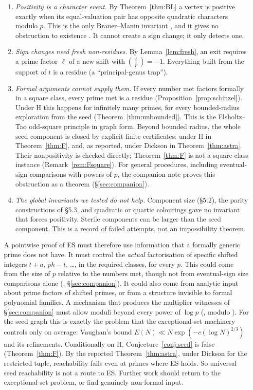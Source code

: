 \documentclass[11pt,reqno]{amsart}
\theoremstyle{definition}
\newcommand{\leg}[2]{\left(\frac{#1}{#2}\right)}
\begin{document}
\begin{enumerate}
\item \emph{Positivity is a character event.}  By Theorem~\ref{thm:BL} a
vertex is positive exactly when its equal-valuation pair has opposite
quadratic characters modulo $p$.  This is the only Brauer--Manin invariant
\cite[Thm.~1.6]{BL}, and it gives no obstruction to existence
\cite[Thm.~1.1]{BL}.  It cannot create a sign change; it only detects one.
\item \emph{Sign changes need fresh non-residues.}  By
Lemma~\ref{lem:fresh}, an exit requires a prime factor $\ell$ of a new
shift with $\leg\ell p=-1$.  Everything built from the support of $t$ is a
residue (a ``principal-genus trap'').
\item \emph{Formal arguments cannot supply them.}  If every number met
factors formally in a square class, every prime met is a residue
(Proposition~\ref{prop:schinzel}).  Under H this happens for infinitely
many primes, for every bounded-radius exploration from the seed
(Theorem~\ref{thm:unbounded}).  This is the Elsholtz--Tao odd-square
principle in graph form.  Beyond bounded radius, the whole seed component
is closed by explicit finite certificates: under H in Theorem~\ref{thm:F},
and, as reported, under Dickson in Theorem~\ref{thm:astra}.  Their
nonpositivity is checked directly; Theorem~\ref{thm:F} is not a
square-class instance (Remark~\ref{rem:Fsquare}).  For general
procedures, including eventual-sign comparisons with powers of $p$, the
companion note \cite{PS} proves this obstruction as a theorem
(\S\ref{sec:companion}).
\item \emph{The global invariants we tested do not help.}  Component size
(\S5.2), the parity constructions of \S5.3, and quadratic or quartic
colourings gave no invariant that forces positivity.  Sterile components
can be larger than the seed component.  This is a record of failed
attempts, not an impossibility theorem.
\end{enumerate}

A pointwise proof of ES must therefore use information that a formally
generic prime does not have.  It must control the \emph{actual}
factorisation of specific shifted integers $t+a$, $ph-t$, \dots, in the
required classes, for every $p$.  This could come from the size of $p$
relative to the numbers met, though not from eventual-sign size
comparisons alone (\cite[Prop.~A]{PS}, \S\ref{sec:companion}).  It could
also come from analytic input about prime factors of
shifted primes, or from a structure invisible to formal polynomial
families.  A mechanism that produces the multiplier witnesses of
\S\ref{sec:companion} must allow moduli beyond every power of $\log p$
(\cite[Thm.~5.2]{PO3}, modulo \cite{TZ}).  For the seed graph this is exactly the problem that the
exceptional-set machinery controls only on average: Vaughan's bound
$E(N)\ll N\exp(-c(\log N)^{2/3})$ \cite{Vaughan} and its refinements.
Conditionally on H, Conjecture~\ref{conj:seed} is false
(Theorem~\ref{thm:F}).  By the reported Theorem~\ref{thm:astra}, under
Dickson for the restricted tuple, reachability fails even at primes where
ES holds.  So universal seed
reachability is not a route to ES.  Further work should return to the
exceptional-set problem, or find genuinely non-formal input.
\end{document}
